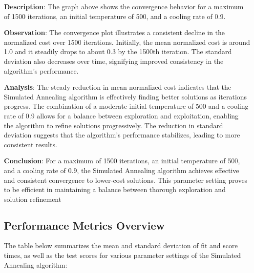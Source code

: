 \documentclass{article}
\begin{document}
    \textbf{Description}: The graph above shows the convergence behavior for a maximum of 1500 iterations, an initial temperature of 500, and a cooling rate of 0.9.

    \textbf{Observation}: The convergence plot illustrates a consistent decline in the normalized cost over 1500 iterations. Initially, the mean normalized cost is around 1.0 and it steadily drops to about 0.3 by the 1500th iteration. The standard deviation also decreases over time, signifying improved consistency in the algorithm’s performance.

    \textbf{Analysis}: The steady reduction in mean normalized cost indicates that the Simulated Annealing algorithm is effectively finding better solutions as iterations progress. The combination of a moderate initial temperature of 500 and a cooling rate of 0.9 allows for a balance between exploration and exploitation, enabling the algorithm to refine solutions progressively. The reduction in standard deviation suggests that the algorithm's performance stabilizes, leading to more consistent results.

    \textbf{Conclusion}: For a maximum of 1500 iterations, an initial temperature of 500, and a cooling rate of 0.9, the Simulated Annealing algorithm achieves effective and consistent convergence to lower-cost solutions. This parameter setting proves to be efficient in maintaining a balance between thorough exploration and solution refinement

    \subsection{Performance Metrics Overview}

    The table below summarizes the mean and standard deviation of fit and score times, as well as the test scores for various parameter settings of the Simulated Annealing algorithm:
\end{document}
